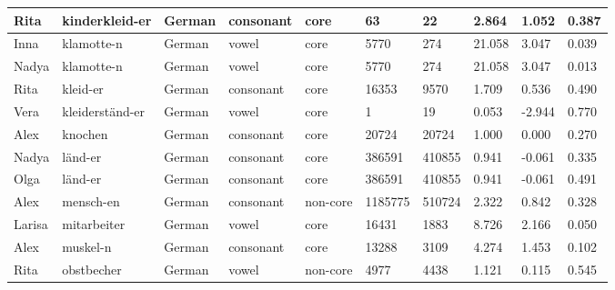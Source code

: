 \begin{longtable}{|p{1.2cm}|p{3cm}|p{1cm}|p{1.5cm}|p{1.5cm}|R{1.2cm}|R{1cm}|R{1cm}|R{0.8cm}|R{0.8cm}|}
Rita      & kinderkleid-er         & German        & consonant        & core      & 63           & 22             & 2.864                 & 1.052             & 0.387        \\ \hline
Inna      & klamotte-n             & German        & vowel            & core      & 5770         & 274            & 21.058                & 3.047             & 0.039        \\ \hline
Nadya     & klamotte-n             & German        & vowel            & core      & 5770         & 274            & 21.058                & 3.047             & 0.013        \\ \hline
Rita      & kleid-er               & German        & consonant        & core      & 16353        & 9570           & 1.709                 & 0.536             & 0.490        \\ \hline
Vera      & kleiderst\"{a}nd-er    & German        & vowel            & core      & 1            & 19             & 0.053                 & -2.944            & 0.770        \\ \hline
Alex      & knochen                & German        & consonant        & core      & 20724        & 20724          & 1.000                 & 0.000             & 0.270        \\ \hline
Nadya     & l\"{a}nd-er            & German        & consonant        & core      & 386591       & 410855         & 0.941                 & -0.061            & 0.335        \\ \hline
Olga      & l\"{a}nd-er            & German        & consonant        & core      & 386591       & 410855         & 0.941                 & -0.061            & 0.491        \\ \hline
Alex      & mensch-en              & German        & consonant        & non-core  & 1185775      & 510724         & 2.322                 & 0.842             & 0.328        \\ \hline
Larisa    & mitarbeiter            & German        & vowel            & core      & 16431        & 1883           & 8.726                 & 2.166             & 0.050        \\ \hline
Alex      & muskel-n               & German        & consonant        & core      & 13288        & 3109           & 4.274                 & 1.453             & 0.102        \\ \hline
Rita      & obstbecher             & German        & vowel            & non-core  & 4977         & 4438           & 1.121                 & 0.115             & 0.545        \\ \hline

\end{longtable}
